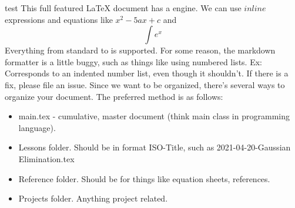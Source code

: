 \markdownRendererOlBeginTight
{}test\markdownRendererOlItemEnd 
\markdownRendererOlEndTight \markdownRendererInterblockSeparator
{}\markdownRendererUlBegin
\markdownRendererUlItem This full featured LaTeX document has a  engine.\markdownRendererUlItemEnd 
\markdownRendererUlItem We can use $inline$ expressions and equations like $x^2-5ax+c$ and $$\int e^x$$\markdownRendererUlItemEnd 
\markdownRendererUlItem Everything from standard  to  is supported.\markdownRendererUlItemEnd 
\markdownRendererUlEnd \markdownRendererInterblockSeparator
{}For some reason, the markdown formatter is a little buggy, such as things like using numbered lists. Ex:\markdownRendererInterblockSeparator
{}\markdownRendererOlBeginTight
{}Corresponds to an indented number list, even though it shouldn't. If there is a fix, please file an issue.\markdownRendererOlItemEnd 
\markdownRendererOlEndTight \markdownRendererInterblockSeparator
{}\markdownRendererInterblockSeparator
{}Since we want to be organized, there's several ways to organize your document. The preferred method is as follows:\markdownRendererInterblockSeparator
{}\markdownRendererInterblockSeparator
{}\begin{itemize} \item main.tex - cumulative, master document (think main class in programming language). \item Lessons folder. Should be in format ISO-Title, such as 2021-04-20-Gaussian Elimination.tex \item Reference folder. Should be for things like equation sheets, references. \item Projects folder. Anything project related. \end{itemize}\relax